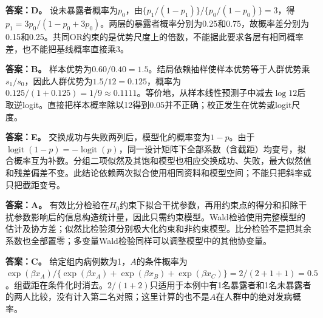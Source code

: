\textbf{答案：D。} 设未暴露者概率为$p_0$，由$\{p_1/(1-p_1)\}/\{p_0/(1-p_0)\}=3$，得$p_1=3p_0/(1-p_0+3p_0)$。两层的暴露者概率分别为0.25和0.75，故概率差分别为0.15和0.25。共同OR约束的是优势尺度上的倍数，不能据此要求各层有相同概率差，也不能把基线概率直接乘3。
\par\nobreak\smallskip{}

\textbf{答案：B。} 样本优势为$0.60/0.40=1.5$。结局依赖抽样使样本优势等于人群优势乘$s_1/s_0$，因此人群优势为$1.5/12=0.125$，概率为$0.125/(1+0.125)=1/9\approx0.1111$。等价地，从样本线性预测子中减去$\log12$后取逆logit。直接把样本概率除以12得到0.05并不正确；校正发生在优势或logit尺度。
\par\nobreak\smallskip{}

\textbf{答案：E。} 交换成功与失败两列后，模型化的概率变为$1-p$。由于$\operatorname{logit}(1-p)=-\operatorname{logit}(p)$，同一设计矩阵下全部系数（含截距）均变号，拟合概率互为补数。分组二项似然及其饱和模型也相应交换成功、失败，最大似然值和残差偏差不变。此结论依赖两次拟合使用相同资料和模型空间；不能只把斜率或只把截距变号。
\par\nobreak\smallskip{}

\textbf{答案：A。} 有效比分检验在$H_0$约束下拟合干扰参数，再用约束点的得分和扣除干扰参数影响后的信息构造统计量，因此只需约束模型。Wald检验使用完整模型的估计及协方差；似然比检验须分别极大化约束和非约束模型。比分检验不是把其余系数也全部置零；多变量Wald检验同样可以调整模型中的其他协变量。
\par\nobreak\smallskip{}

\textbf{答案：C。} 给定组内病例数为1，$A$的条件概率为$\exp(\beta x_A)/\{\exp(\beta x_A)+\exp(\beta x_B)+\exp(\beta x_C)\}=2/(2+1+1)=0.5$。组截距在条件化时消去。$2/(1+2)$只适用于本例中有1名暴露者和1名未暴露者的两人比较，没有计入第二名对照；这里计算的也不是$A$在人群中的绝对发病概率。
\par\nobreak\smallskip{}


